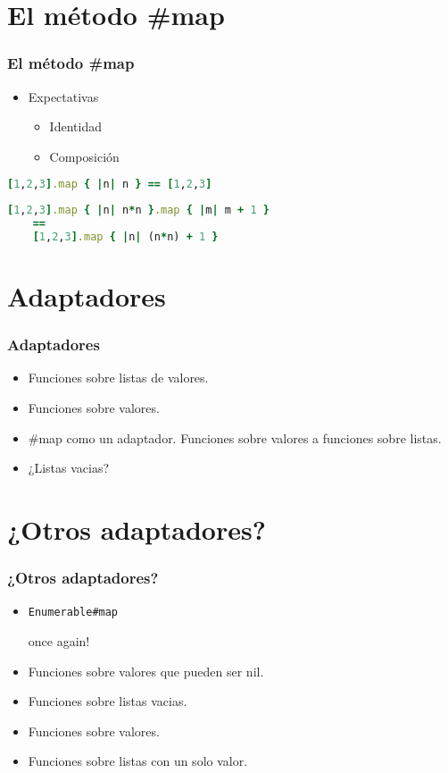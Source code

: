 \documentclass{beamer}
\begin{document}
\section{El método \#map}
\begin{frame}[fragile]
  \frametitle{El método \#map}
  \begin{itemize}
    \item Expectativas
    \begin{itemize}
        \item Identidad
        \item Composición
    \end{itemize}
  \end{itemize}

  \begin{lstlisting}[language=Ruby, caption=Identidad de \#map]
    [1,2,3].map { |n| n } == [1,2,3]
  \end{lstlisting}

  \begin{lstlisting}[language=Ruby, caption=Composición de \#map]
    [1,2,3].map { |n| n*n }.map { |m| m + 1 }
    ==
    [1,2,3].map { |n| (n*n) + 1 }
  \end{lstlisting}

\end{frame}

\section{Adaptadores}
\begin{frame}[fragile]
  \frametitle{Adaptadores}
  \begin{itemize}
    \item Funciones sobre listas de valores.
    \item Funciones sobre valores.
    \item \#map como un adaptador. Funciones sobre valores a funciones
      sobre listas.
    \item ¿Listas vacias?
  \end{itemize}
\end{frame}

\section{¿Otros adaptadores?}
\begin{frame}[fragile]
  \frametitle{¿Otros adaptadores?}
  \begin{itemize}
    \item \begin{verbatim}Enumerable#map\end{verbatim} once again!
    \item Funciones sobre valores que pueden ser nil.
    \item Funciones sobre listas vacias.
    \item Funciones sobre valores.
    \item Funciones sobre listas con un solo valor.
  \end{itemize}
\end{frame}
\end{document}
